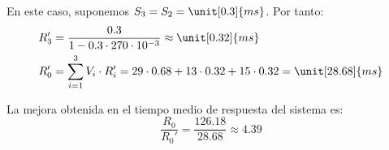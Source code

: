 \begin{ejercicio}
\begin{enumerate}
        En este caso, suponemos $S_3=S_2=\unit[0.3]{ms}$. Por tanto:
        \begin{align*}
            R_3' &= \dfrac{0.3}{1 - 0.3 \cdot 270\cdot 10^{-3}} \approx \unit[0.32]{ms} \\
            R_0' &= \sum_{i=1}^{3} V_i \cdot R_i' = 29 \cdot 0.68 + 13 \cdot 0.32 + 15 \cdot 0.32 = \unit[28.68]{ms}
        \end{align*}

        La mejora obtenida en el tiempo medio de respuesta del sistema es:
        \begin{equation*}
            \dfrac{R_0}{R_0'} = \dfrac{126.18}{28.68} \approx 4.39
        \end{equation*}
    \end{enumerate}
\end{ejercicio}
\begin{comment}
\solucion
    \begin{enumerate}
        \item El tiempo mínimo de respuesta absoluto es 54.4 ms.
        \item $R_1 = 0.68$, $R_2 = 0.32$, $R_3 = 6.82$ (expresado en ms).
        \item El tiempo medio de respuesta del sistema es $R_0 = 126.1$ ms.
        \item El tiempo medio de respuesta mejora 4.39 veces.
    \end{enumerate}
\end{comment}


